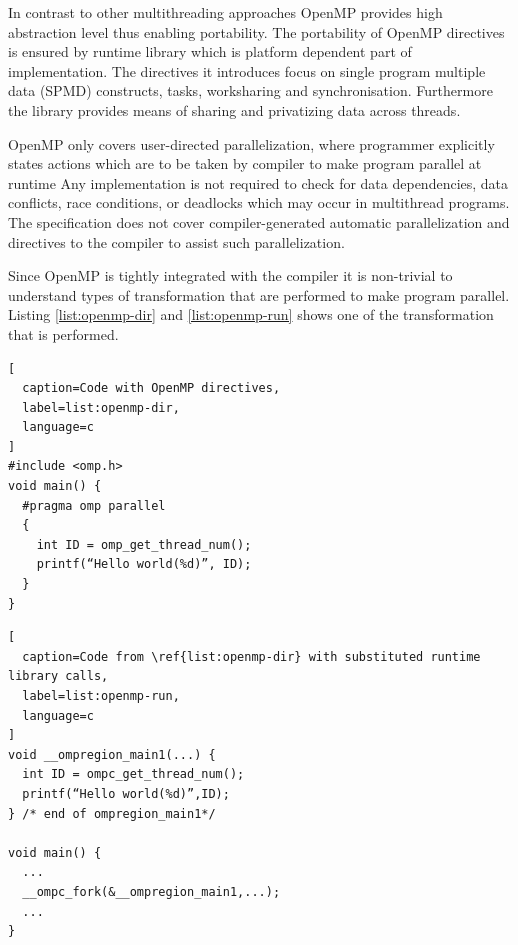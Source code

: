 \documentclass[12pt, a4paper]{report}
\begin{document}
In contrast to other multithreading approaches OpenMP provides high
abstraction level thus enabling portability. The portability of OpenMP directives
is ensured by runtime library which is platform dependent part of implementation.
The directives it introduces focus on single program multiple data
(SPMD) constructs, tasks, worksharing and synchronisation.
Furthermore the library provides means of sharing and privatizing
data across threads.

OpenMP only covers user-directed parallelization, where programmer explicitly
states actions which are to be taken by compiler to make program parallel at runtime
Any implementation is not required to check for data dependencies, data conflicts,
race conditions, or deadlocks which may occur in multithread programs.
The specification does not cover compiler-generated automatic parallelization and
directives to the compiler to assist such parallelization.

Since OpenMP is tightly integrated with the compiler it is non-trivial to
understand types of transformation that are performed to make program parallel.
Listing \ref{list:openmp-dir} and \ref{list:openmp-run} shows one of the transformation that is performed.

\begin{lstlisting}[
  caption=Code with OpenMP directives,
  label=list:openmp-dir,
  language=c
]
#include <omp.h>
void main() {
  #pragma omp parallel
  {
    int ID = omp_get_thread_num();
    printf(“Hello world(%d)”, ID);
  }
}
\end{lstlisting}

\begin{lstlisting}[
  caption=Code from \ref{list:openmp-dir} with substituted runtime library calls,
  label=list:openmp-run,
  language=c
]
void __ompregion_main1(...) {
  int ID = ompc_get_thread_num();
  printf(“Hello world(%d)”,ID);
} /* end of ompregion_main1*/

void main() {
  ...
  __ompc_fork(&__ompregion_main1,...);
  ...
}
\end{lstlisting}
\end{document}
